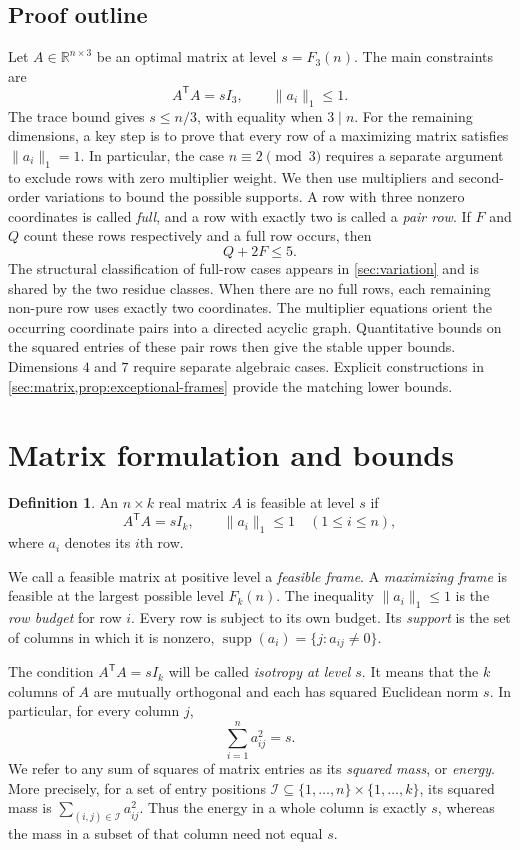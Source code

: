 \documentclass[11pt]{article}
\numberwithin{equation}{section}
\theoremstyle{definition}
\newtheorem{definition}[definition]{Definition}
\theoremstyle{definition}
\newcommand{\norm}[1]{\lVert#1\rVert}
\DeclareMathOperator{\supp}{supp}
\begin{document}
\subsection{Proof outline}
Let $A\in\mathbb R^{n\times3}$ be an optimal matrix at level
$s=F_3(n)$.  The main constraints are
\[
 A^{\mathsf T}A=sI_3,\qquad \|a_i\|_1\le1.
\]
The trace bound gives $s\le n/3$, with equality when $3\mid n$.
For the remaining dimensions, a key step is to prove that every row
of a maximizing matrix satisfies $\|a_i\|_1=1$. In particular, the
case $n\equiv2\pmod3$ requires a separate argument to exclude rows
with zero multiplier weight. We then use multipliers and second-order
variations to bound the possible supports. A row with three nonzero
coordinates is called \emph{full}, and a row with exactly two is called
a \emph{pair row}. If $F$ and $Q$ count these rows respectively and a
full row occurs, then
\[
 Q+2F\le5.
\]
The structural classification of full-row cases appears in
\cref{sec:variation} and is shared by the two residue classes.
When there are no full rows, each remaining non-pure row uses exactly
two coordinates. The multiplier equations orient the occurring
coordinate pairs into a directed acyclic graph. Quantitative bounds
on the squared entries of these pair rows then give the stable upper
bounds. Dimensions $4$ and $7$ require separate algebraic cases.
Explicit constructions in \cref{sec:matrix,prop:exceptional-frames}
provide the matching lower bounds.

\section{Matrix formulation and bounds}
\label{sec:matrix}
\begin{definition}
An $n\times k$ real matrix $A$ is feasible at level $s$ if
\[
 A^{\mathsf T}A=sI_k,\qquad \norm{a_i}_1\le1\quad(1\le i\le n),
\]
where $a_i$ denotes its $i$th row.
\end{definition}

We call a feasible matrix at positive level a \emph{feasible frame}.
A \emph{maximizing frame} is feasible at the largest possible level
$F_k(n)$. The inequality $\|a_i\|_1\le1$ is the \emph{row budget}
for row $i$. Every row is subject to its own budget.
Its \emph{support} is the set of columns in which it is nonzero,
$\supp(a_i)=\{j:a_{ij}\ne0\}$.

The condition $A^{\mathsf T}A=sI_k$ will be called \emph{isotropy at
level $s$}. It means that the $k$ columns of $A$ are mutually
orthogonal and each has squared Euclidean norm $s$. In particular,
for every column $j$,
\[
 \sum_{i=1}^{n}a_{ij}^2=s.
\]
We refer to any sum of squares of matrix entries as its
\emph{squared mass}, or \emph{energy}. More precisely, for a set of
entry positions $\mathcal I\subseteq\{1,\ldots,n\}\times
\{1,\ldots,k\}$, its squared mass is
$\sum_{(i,j)\in\mathcal I}a_{ij}^2$. Thus the energy in a whole
column is exactly $s$, whereas the mass in a subset of that column
need not equal $s$.
\end{document}
